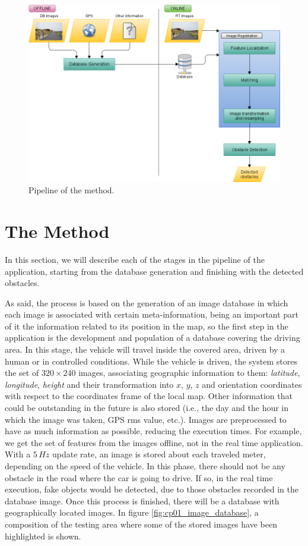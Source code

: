 \begin{figure}[thb]
  \centering
  \includegraphics{pipeline}
  \caption{Pipeline of the method.}
  \label{fig:cp01_pipeline}
\end{figure}

\section{The Method}\label{ch:chapter01_01}

In this section, we will describe each of the stages in the pipeline of the application, starting from the database generation and finishing with the detected obstacles.

As said, the process is based on the generation of an image database in which each image is associated with certain meta-information, being an important part of it the information related to its position in the map, so the first step in the application is the development and population of a database covering the driving area. In this stage, the vehicle will travel inside the covered area, driven by a human or in controlled conditions. While the vehicle is driven, the system stores the set of $320 \times 240$ images, associating geographic information to them: \emph{latitude}, \emph{longitude}, \emph{height} and their transformation into $x$, $y$, $z$ and orientation coordinates with respect to the coordinates frame of the local map. Other information that could be outstanding in the future is also stored (i.e., the day and the hour in which the image was taken, \acs{GPS} rms value, etc.). Images are preprocessed to have as much information as possible, reducing the execution times. For example, we get the set of features from the images offline, not in the real time application. With a $5\,Hz$ update rate, an image is stored about each traveled meter, depending on the speed of the vehicle. In this phase, there should not be any obstacle in the road where the car is going to drive. If so, in the real time execution, fake objects would be detected, due to those obstacles recorded in the database image. Once this process is finished, there will be a database with geographically located images. In figure \ref{fig:cp01_image_database}, a composition of the testing area where some of the stored images have been highlighted is shown.

